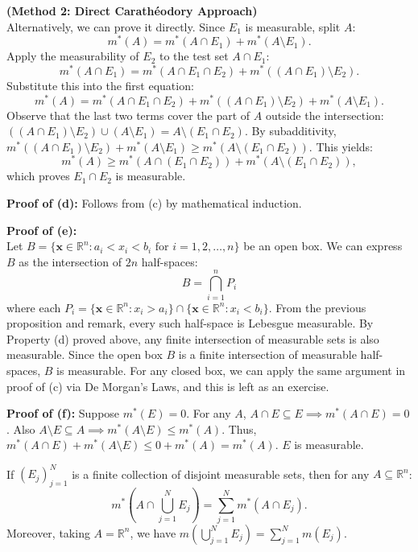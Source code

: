 \begin{pfbox}
    \textbf{(Method 2: Direct Carath\'eodory Approach)} \\
    Alternatively, we can prove it directly. Since $E_1$ is measurable, split $A$:
    $$m^*(A) = m^*(A \cap E_1) + m^*(A \setminus E_1).$$
    Apply the measurability of $E_2$ to the test set $A \cap E_1$:
    $$m^*(A \cap E_1) = m^*(A \cap E_1 \cap E_2) + m^*((A \cap E_1) \setminus E_2).$$
    Substitute this into the first equation:
    $$m^*(A) = m^*(A \cap E_1 \cap E_2) + m^*((A \cap E_1) \setminus E_2) + m^*(A \setminus E_1).$$
    Observe that the last two terms cover the part of $A$ outside the intersection: $((A \cap E_1) \setminus E_2) \cup (A \setminus E_1) = A \setminus (E_1 \cap E_2)$.
    By subadditivity, $m^*((A \cap E_1) \setminus E_2) + m^*(A \setminus E_1) \ge m^*(A \setminus (E_1 \cap E_2))$.
    This yields:
    $$m^*(A) \ge m^*(A \cap (E_1 \cap E_2)) + m^*(A \setminus (E_1 \cap E_2)),$$
    which proves $E_1 \cap E_2$ is measurable.

    \textbf{Proof of (d):} Follows from (c) by mathematical induction.

    \textbf{Proof of (e):} \\
    Let $B = \{\mathbf{x} \in \mathbb{R}^n : a_i < x_i < b_i \text{ for } i=1,2,\dots,n\}$ be an open box. 
    We can express $B$ as the intersection of $2n$ half-spaces:
    $$ B = \bigcap_{i=1}^n P_i $$
    where each $P_i = \{\mathbf{x} \in \mathbb{R}^n : x_i > a_i\} \cap \{\mathbf{x} \in \mathbb{R}^n : x_i < b_i\}$.
    From the previous proposition and remark, every such half-space is Lebesgue measurable.
    By Property (d) proved above, any finite intersection of measurable sets is also measurable. 
    Since the open box $B$ is a finite intersection of measurable half-spaces, $B$ is measurable. 
    For any closed box, we can apply the same argument in proof of (c) via De Morgan's Laws, and this is left as an exercise.

    \textbf{Proof of (f):} Suppose $m^*(E) = 0$. For any $A$, $A \cap E \subseteq E \implies m^*(A \cap E) = 0$.
    Also $A \setminus E \subseteq A \implies m^*(A \setminus E) \le m^*(A)$.
    Thus, $m^*(A \cap E) + m^*(A \setminus E) \le 0 + m^*(A) = m^*(A)$. $E$ is measurable.
\end{pfbox}

\begin{theorem}
    If $(E_j)_{j=1}^N$ is a finite collection of disjoint measurable sets, then for any $A \subseteq \mathbb{R}^n$:
    \[ m^*\left(A \cap \bigcup_{j=1}^N E_j\right) = \sum_{j=1}^N m^*(A \cap E_j). \]
    Moreover, taking $A = \mathbb{R}^n$, we have $m\left(\bigcup_{j=1}^N E_j\right) = \sum_{j=1}^N m(E_j)$.
\end{theorem}

